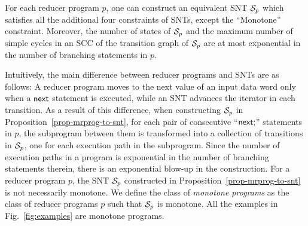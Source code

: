 

\begin{proposition}\label{prop-mrprog-to-snt}
For each reducer program $p$, one can construct an equivalent SNT ${\mathcal{S} }_p$ which satisfies all the additional four constraints of SNTs, except the ``Monotone'' constraint.  Moreover, the number of states of ${\mathcal{S} }_p$ and the maximum number of simple cycles in an SCC of the transition graph of ${\mathcal{S} }_p$ are at most exponential in the number of branching statements in $p$. 
\end{proposition}
Intuitively, the main difference between reducer programs and SNTs are as follows: A reducer program moves to the next value of an input data word only when a $\mathsf{next}$ statement is executed, while an SNT advances the iterator in each transition.
As a result of this difference, when constructing ${\mathcal{S} }_p$ in Proposition~\ref{prop-mrprog-to-snt}, for each pair of consecutive ``$\mathsf{next};$'' statements in $p$, the subprogram between them is transformed into a collection of transitions in ${\mathcal{S} }_p$, one for each execution path in the subprogram. Since the number of execution paths in a program is exponential in the number of branching statements therein, there is an exponential blow-up in the construction. For a reducer program $p$, the SNT ${\mathcal{S} }_p$ constructed in Proposition~\ref{prop-mrprog-to-snt} is not necessarily monotone. We define the class of \emph{monotone programs} as the class of reducer programs $p$ such that ${\mathcal{S} }_p$ is monotone. All the examples in Fig.~\ref{fig:examples} are monotone programs. 




%
%
%


